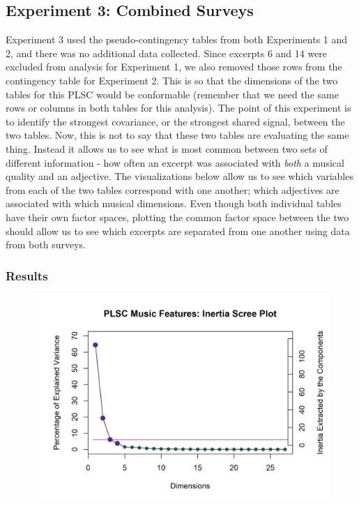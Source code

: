 \documentclass[
  english,
  man,floatsintext]{apa6}
\begin{document}
\hypertarget{experiment-3-combined-surveys}{%
\subsection{Experiment 3: Combined Surveys}\label{experiment-3-combined-surveys}}

Experiment 3 used the pseudo-contingency tables from both Experiments 1 and 2, and there was no additional data collected. Since excerpts 6 and 14 were excluded from analysis for Experiment 1, we also removed those rows from the contingency table for Experiment 2. This is so that the dimensions of the two tables for this PLSC would be conformable (remember that we need the same rows or columns in both tables for this analysis). The point of this experiment is to identify the strongest covariance, or the strongest shared signal, between the two tables. Now, this is not to say that these two tables are evaluating the same thing. Instead it allows us to see what is most common between two sets of different information - how often an excerpt was associated with \emph{both} a musical quality and an adjective. The visualizations below allow us to see which variables from each of the two tables correspond with one another; which adjectives are associated with which musical dimensions. Even though both individual tables have their own factor spaces, plotting the common factor space between the two should allow us to see which excerpts are separated from one another using data from both surveys.

\hypertarget{results-1}{%
\subsubsection{Results}\label{results-1}}

\begin{figure}  
  \begin{center}
    \includegraphics{./Music-Descriptor-Space_files/figure-latex/screePLSC-1.png}
  \caption{ }\label{fig:screePLSC}  
 \end{center}
\end{figure}
\end{document}

